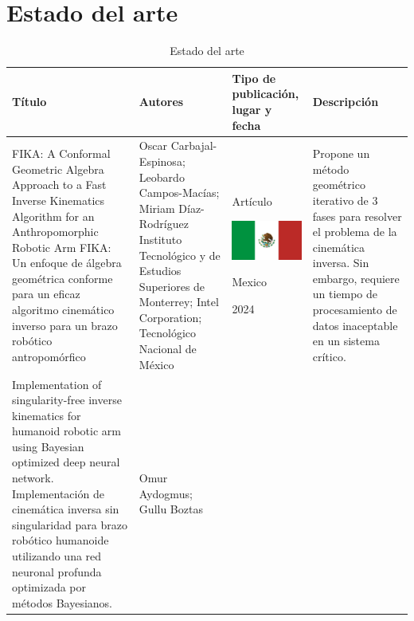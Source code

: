 \documentclass[12pt, twoside]{report}
\begin{document}
\newpage
\section{Estado del arte}

\begin{table}[htb]
    \caption{Estado del arte}
    \centering
    \begin{tabular}{p{3.8cm}p{3.8cm}p{3.8cm}p{3.8cm}}
        \textbf{Título} & \textbf{Autores} & \textbf{Tipo de publicación, lugar y fecha} & \textbf{Descripción} \\ 
        \midrule
        FIKA: A Conformal Geometric Algebra Approach to a Fast Inverse Kinematics Algorithm for an Anthropomorphic Robotic Arm \newline\newline
        FIKA: Un enfoque de álgebra geométrica conforme para un eficaz algoritmo cinemático inverso para un brazo robótico antropomórfico &  
        Oscar Carbajal-Espinosa; Leobardo Campos-Macías; Miriam Díaz-Rodríguez \newline\newline
        Instituto Tecnológico y de Estudios Superiores de Monterrey; Intel Corporation; Tecnológico Nacional de México & 
        \begin{center}Artículo \par \includegraphics[width=3cm]{mexico.jpg} \par Mexico \par 2024\end{center} & 
        Propone un método geométrico iterativo de 3 fases para resolver el problema de la cinemática inversa.\newline\newline
        Sin embargo, requiere un tiempo de procesamiento de datos inaceptable en un sistema crítico.\\
        \midrule
        Implementation of singularity-free inverse kinematics for humanoid robotic arm using Bayesian optimized deep neural network. \newline\newline
        Implementación de cinemática inversa sin singularidad para brazo robótico humanoide utilizando una red neuronal profunda optimizada por métodos Bayesianos. &  
        Omur Aydogmus; Gullu Boztas \newline\newline 

\end{tabular}
\end{table}
\end{document}
